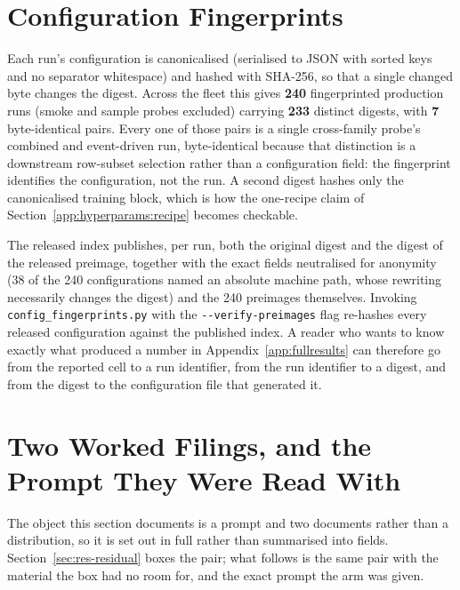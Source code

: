 \FloatBarrier
\section{Configuration Fingerprints}
\label{app:hyperparams:fingerprints}

Each run's configuration is canonicalised (serialised to JSON with sorted keys
and no separator whitespace) and hashed with SHA-256, so that a single changed
byte changes the digest. Across the fleet this gives \textbf{240} fingerprinted production runs
(smoke and sample probes excluded) carrying \textbf{233} distinct digests, with
\textbf{7} byte-identical pairs. %
Every one of those pairs is a single cross-family probe's combined and
event-driven run, byte-identical because that distinction is a downstream
row-subset selection rather than a configuration field: the fingerprint
identifies the configuration, not the run. %
A second digest hashes only the canonicalised training block, which is how the
one-recipe claim of Section~\ref{app:hyperparams:recipe} becomes checkable.

The released index publishes, per run, both the original digest and the digest of
the released preimage, together with the exact fields neutralised for anonymity
(38 of the 240 configurations named an absolute machine path, whose rewriting
necessarily changes the digest) and the 240 preimages themselves. Invoking
\texttt{config\_fingerprints.py} with the \texttt{-{}-verify-preimages} flag
re-hashes every released configuration against the published index. %
A reader who wants to know exactly what produced a number in
Appendix~\ref{app:fullresults} can therefore go from the reported cell to a run
identifier, from the run identifier to a digest, and from the digest to the
configuration file that generated it.

\FloatBarrier
\section{Two Worked Filings, and the Prompt They Were Read With}
\label{app:vis-worked}

The object this section documents is a prompt and two documents rather than a
distribution, so it is set out in full rather than summarised into fields. Section~\ref{sec:res-residual} boxes the pair; what
follows is the same pair with the material the box had no room for, and the
exact prompt the arm was given.

